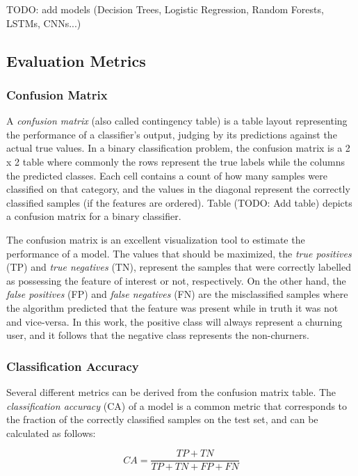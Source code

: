 \documentclass{kththesis}
\begin{document}
TODO: add models (Decision Trees, Logistic Regression, Random Forests, LSTMs, CNNs...)

\subsection{Evaluation Metrics}

\subsubsection{Confusion Matrix}

A \emph{confusion matrix} (also called contingency table) is a table layout representing the performance of a classifier's output, judging by its predictions against the actual true values. In a binary classification problem, the confusion matrix is a 2 x 2 table where commonly the rows represent the true labels while the columns the predicted classes. Each cell contains a count of how many samples were classified on that category, and the values in the diagonal represent the correctly classified samples (if the features are ordered). Table (TODO: Add table) depicts a confusion matrix for a binary classifier.

The confusion matrix is an excellent visualization tool to estimate the performance of a model. The values that should be maximized, the \emph{true positives} (TP) and \emph{true negatives} (TN), represent the samples that were correctly labelled as possessing the feature of interest or not, respectively. On the other hand, the \emph{false positives} (FP) and \emph{false negatives} (FN) are the misclassified samples where the algorithm predicted that the feature was present while in truth it was not and vice-versa. In this work, the positive class will always represent a churning user, and it follows that the negative class represents the non-churners.

\subsubsection{Classification Accuracy}

Several different metrics can be derived from the confusion matrix table. The \emph{classification accuracy} (CA) of a model is a common metric that corresponds to the fraction of the correctly classified samples on the test set, and can be calculated as follows:

\begin{equation}
CA = \frac{TP + TN}{TP + TN + FP + FN} 
\end{equation}
\end{document}
